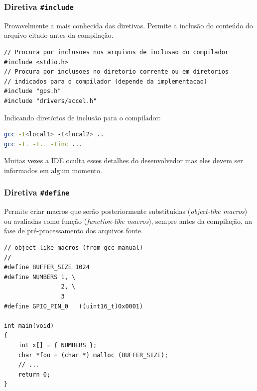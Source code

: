 \documentclass{beamer}
\begin{document}
\begin{frame}[fragile]
	\frametitle{Diretiva \texttt{\#include}}
	Provavelmente a mais conhecida das diretivas. Permite a inclusão do conteúdo do arquivo citado antes da compilação.

	\begin{lstlisting}[style=customc]
// Procura por inclusoes nos arquivos de inclusao do compilador
#include <stdio.h>
// Procura por inclusoes no diretorio corrente ou em diretorios
// indicados para o compilador (depende da implementacao)
#include "gps.h"
#include "drivers/accel.h"
	\end{lstlisting}

	Indicando diretórios de inclusão para o compilador:

	\begin{lstlisting}[style=customc,language=bash]
gcc -I<local1> -I<local2> ..
gcc -I. -I.. -Iinc ...
	\end{lstlisting}

	Muitas vezes a IDE oculta esses detalhes do desenvolvedor mas eles devem ser informados em algum momento.

\end{frame}

\begin{frame}[fragile]
	\frametitle{Diretiva \texttt{\#define}}
	Permite criar macros que serão posteriormente substituídas (\textit{object-like macros}) ou avaliadas como função (\textit{function-like macros}), sempre antes da compilação, na fase de pré-processamento dos arquivos fonte.

	\begin{lstlisting}[style=customc]
// object-like macros (from gcc manual)
//
#define BUFFER_SIZE 1024
#define NUMBERS 1, \
                2, \
                3
#define GPIO_PIN_0   ((uint16_t)0x0001)

int main(void)
{
    int x[] = { NUMBERS };
    char *foo = (char *) malloc (BUFFER_SIZE);
    // ...
    return 0;
}
	\end{lstlisting}
\end{frame}
\end{document}
